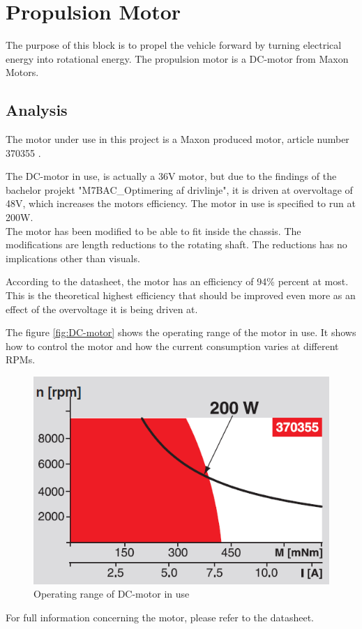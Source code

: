\section{Propulsion Motor}
The purpose of this block is to propel the vehicle forward by turning electrical energy into rotational energy. The propulsion motor is a DC-motor from Maxon Motors. 

\subsection{Analysis}
The motor under use in this project is a Maxon produced motor, article number 370355 .

The DC-motor in use, is actually a 36V motor, but due to the findings of the bachelor projekt "M7BAC\_Optimering af drivlinje", it is driven at overvoltage of 48V, which increases the motors efficiency. The motor in use is specified to run at 200W.\\
The motor has been modified to be able to fit inside the chassis. The modifications are length reductions to the rotating shaft. The reductions has no implications other than visuals. 

According to the datasheet, the motor has an efficiency of 94\% percent at most. This is the theoretical highest efficiency that should be improved even more as an effect of the overvoltage it is being driven at. 

The figure \vref{fig:DC-motor} shows the operating range of the motor in use. It shows how to control the motor and how the current consumption varies at different RPMs.

\begin{figure}[H]
	\centering
	\includegraphics[width=0.6\linewidth]{Hardware/Pictures/DC-motor_diagram}
	\caption{Operating range of DC-motor in use}
	\label{fig:DC-motor}
\end{figure}

For full information concerning the motor, please refer to the datasheet. 

